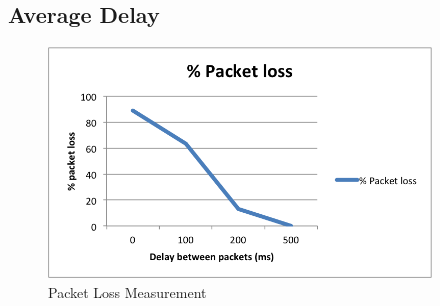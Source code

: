 \subsection{Average Delay}
\begin{center}
\begin{figure}[ht!]
 \centering
 \includegraphics[width=4.0in]{packetloss.png}
\caption{Packet Loss Measurement}
\label{fig:pktloss}
\end{figure}
\end{center}
